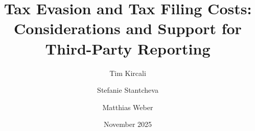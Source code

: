 \documentclass{beamer}
\title[Tax Evasion and Tax Filing Costs]{Tax Evasion and Tax Filing Costs: \\Considerations and Support for Third-Party Reporting} %
\author[Kircali, Stantcheva and Weber] %
{Tim Kircali\inst{1} \and Stefanie Stantcheva\inst{2} \and Matthias Weber\inst{1}}
\institute[] %
{
\inst{1} University of St.Gallen \\
\inst{2} Harvard University
}
{
\medskip

}
\date[November 2025]{November 2025}
\begin{document}
\begin{frame}
\titlepage %
\end{frame}




\end{document}
